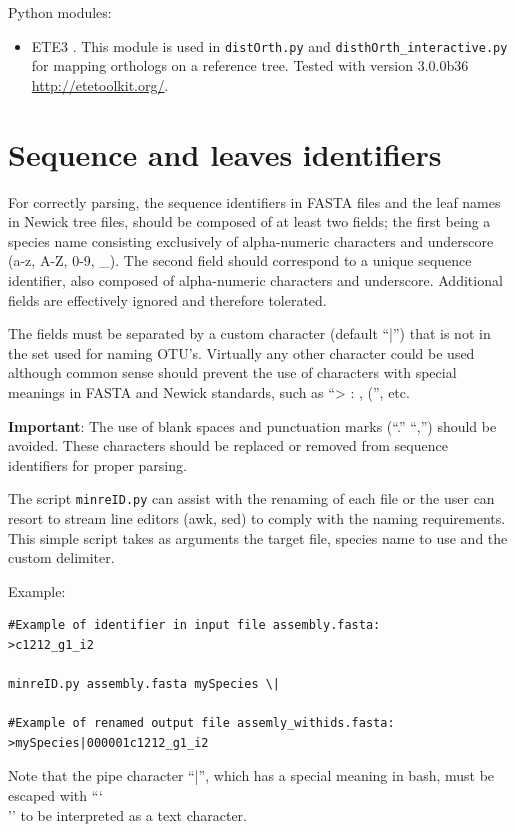 \documentclass[10pt]{article}
\begin{document}
Python modules:
\begin{itemize}

\item ETE3 \citep{Huerta-Cepas2016}. This module is used in \texttt{distOrth.py} and
\texttt{disthOrth\_interactive.py} for mapping orthologs on a reference
tree. Tested with version 3.0.0b36
\url{http://etetoolkit.org/}.
\end{itemize}


\section{Sequence and leaves identifiers}\label{sec:sequenceNames} For
correctly parsing, the sequence identifiers in FASTA files and the leaf
names in Newick tree files, should be composed of at least two fields;
the first being a species name consisting exclusively of alpha-numeric
characters and underscore (a-z, A-Z, 0-9, \_). The second field should
correspond to a unique sequence identifier, also composed of
alpha-numeric characters and underscore. Additional fields are
effectively ignored and therefore tolerated.

The fields must be separated by a custom character (default ``|'')
that is not in the set used for naming OTU's. Virtually any other
character could be used although common sense should prevent the use
of characters with special meanings in FASTA and Newick standards,
such as ``> : , ('', etc.

\textbf{Important}: The use of blank spaces and punctuation marks
(``.'' ``,'') should be avoided. These characters should be replaced or
removed from sequence identifiers for proper parsing.

The script \texttt{minreID.py} can assist with the renaming of each
file or the user can resort to stream line editors (awk, sed) to
comply with the naming requirements. This simple script takes as arguments the target file, species name to use and the custom delimiter.


Example:

\begin{lstlisting} 
#Example of identifier in input file assembly.fasta:
>c1212_g1_i2

minreID.py assembly.fasta mySpecies \|

#Example of renamed output file assemly_withids.fasta:
>mySpecies|000001c1212_g1_i2
\end{lstlisting}

Note that the pipe character ``|'', which has a special meaning in
bash, must be escaped with ``\char`\\'' to be interpreted as a text character.
\end{document}
